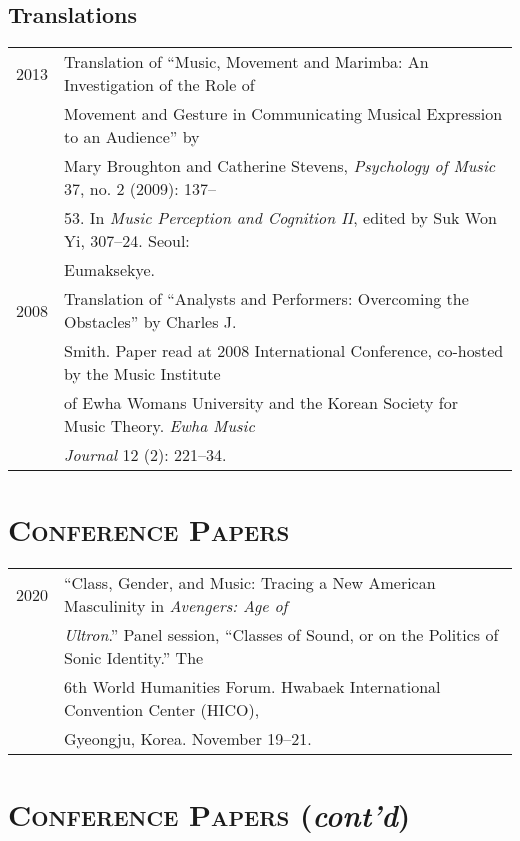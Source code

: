 \documentclass[a4paper,11pt]{article}
\begin{document}
  \subsection*{Translations}
  \hspace*{-0.25cm}
  \begin{tabular}{p{2.5cm} p{12.5cm}}
    2013 & Translation of “Music, Movement and Marimba: An Investigation of the
    Role of\\
    & Movement and Gesture in Communicating Musical Expression to an Audience”
    by\\
    & Mary Broughton and Catherine Stevens, \textit{Psychology of Music} 37,
    no. 2 (2009): 137–\\
    & 53. In \textit{Music Perception and Cognition II}, edited by Suk Won Yi,
    307–24. Seoul:\\
    & Eumaksekye.\\[2mm]
    
    2008 & Translation of “Analysts and Performers: Overcoming the Obstacles”
    by Charles J.\\
    & Smith. Paper read at 2008 International Conference, co-hosted by the
    Music Institute\\
    & of Ewha Womans University and the Korean Society for Music Theory.
    \textit{Ewha Music}\\
    & \textit{Journal} 12 (2): 221–34.
  \end{tabular}
  
  \vspace{5.0mm}
  
  \section*{\textsc{Conference Papers}}
  
  \hspace*{-0.25cm}
  \begin{tabular}{p{2.5cm} p{12.5cm}}
    2020 & “Class, Gender, and Music: Tracing a New American Masculinity in \textit{Avengers: Age of}\\
    & \textit{Ultron}.” Panel session, “Classes of Sound, or on the Politics of Sonic Identity.” The\\
    & 6th World Humanities Forum. Hwabaek International Convention Center (HICO),\\
    & Gyeongju, Korea. November 19–21.
  \end{tabular}
  
  \section*{\textsc{Conference Papers} (\textit{cont'd})}
  
\end{document}
